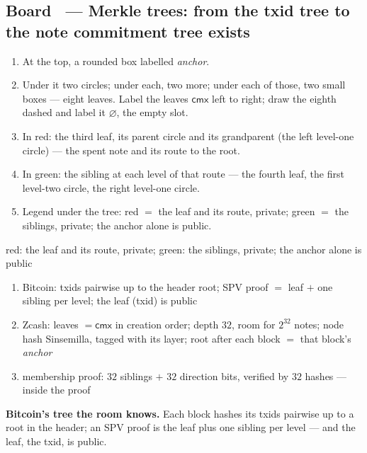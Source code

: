 \documentclass[11pt,a4paper]{article}
\makeatletter
\newcommand{\cmx}{\ensuremath{\mathsf{cmx}}}
\newcounter{board}
\newenvironment{board}[2]{\stepcounter{board}%
  \subsection*{Board \theboard\ --- #1 \hfill {\normalfont\small\color{arb}#2}}}{\medskip}
\newcommand{\Draw}{\draw@head{Draw}}
\newcommand{\Write}{\draw@head{Write}}
\newcommand{\Say}{\draw@head{Say}}
\makeatother
\begin{document}
\begin{board}{Merkle trees: from the txid tree to the note commitment
  tree}{exists}
\Draw
\begin{enumerate}
  \item At the top, a rounded box labelled \emph{anchor}.
  \item Under it two circles; under each, two more; under each of those,
    two small boxes --- eight leaves. Label the leaves $\cmx$ left to
    right; draw the eighth dashed and label it $\varnothing$, the empty
    slot.
  \item In red: the third leaf, its parent circle and its grandparent (the
    left level-one circle) --- the spent note and its route to the root.
  \item In green: the sibling at each level of that route --- the fourth
    leaf, the first level-two circle, the right level-one circle.
  \item Legend under the tree: red $=$ the leaf and its route, private;
    green $=$ the siblings, private; the anchor alone is public.
\end{enumerate}
\begin{center}
\par
{\scriptsize red: the leaf and its route, private; green: the siblings,
private; the anchor alone is public}
\end{center}
\Write
\begin{enumerate}
  \item Bitcoin: txids pairwise up to the header root; SPV proof $=$ leaf
    $+$ one sibling per level; the leaf (txid) is public
  \item Zcash: leaves $= \cmx$ in creation order; depth $32$, room for
    $2^{32}$ notes; node hash Sinsemilla, tagged with its layer; root after
    each block $=$ that block's \emph{anchor}
  \item membership proof: $32$ siblings $+$ $32$ direction bits, verified
    by $32$ hashes --- inside the proof
\end{enumerate}
\Say
\textbf{Bitcoin's tree the room knows.} Each block hashes its txids
pairwise up to a root in the header; an SPV proof is the leaf plus one
sibling per level --- and the leaf, the txid, is public.


\end{board}
\end{document}
